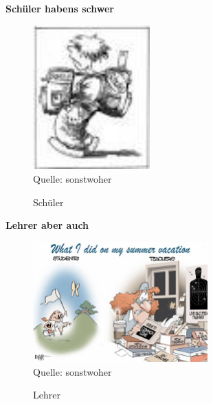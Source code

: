 
\begin{center}
	\textbf{Schüler haben\grq s schwer}
\end{center}

\begin{figure}[h]
	\centering
		\includegraphics[width=0.4\textwidth]{images/Lasten-eines-Schuelers.jpg}\\
		\footnotesize Quelle: sonstwoher
	\caption{Schüler}
	\label{fig:Lasten-eines-Schuelers}
\end{figure}

\begin{center}
	\textbf{Lehrer aber auch}
\end{center}

\begin{figure}[h]
	\centering
		\includegraphics[width=0.60\textwidth]{images/karikatur-lehrer-sommerferien.jpg}\\
		\footnotesize Quelle: sonstwoher
	\caption{Lehrer}
	\label{fig:karikatur-lehrer-sommerferien}
\end{figure}





